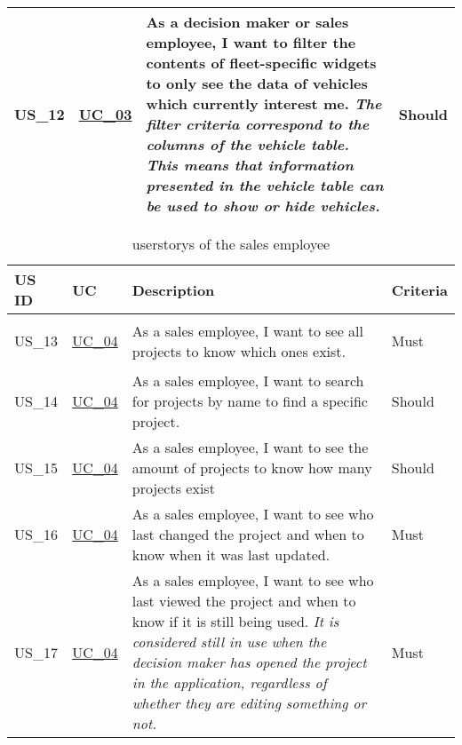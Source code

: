 \begin{footnotesize}
\begin{longtable}[L L L L]{ p{} p{} p{} p{}}
      \rowcolor{Gray}
      \hypertarget{Ref:US12}{US\_12} & \hyperlink{Ref:UC3}{UC\_03} & As a decision maker or sales employee, I want to filter the contents of fleet-specific \glspl{widget} to only see the data of vehicles which currently interest me.
      \newline
      \emph{The filter criteria correspond to the columns of the vehicle table. This means that information presented in the vehicle table can be used to show or hide vehicles.}
      & Should \\

      \bottomrule
    \end{longtable}
  \end{footnotesize}
  \rmfamily

  \sffamily
  \begin{footnotesize}
    \begin{longtable}[L L L L]{ p{} p{} p{} p{} }
      \caption                       %
          {\Glspl{userstory} of the sales employee} %
          \\
      \toprule
      \textbf{US ID} & \textbf{UC} & \textbf{Description} & \textbf{Criteria} \\
      \midrule
      
      \hypertarget{Ref:US13}{US\_13} & \hyperlink{Ref:UC4}{UC\_04} & As a sales employee, I want to see all projects to know which ones exist. & Must \\
      
      \rowcolor{Gray}
      \hypertarget{Ref:US14}{US\_14} & \hyperlink{Ref:UC4}{UC\_04} & As a sales employee, I want to search for projects by name to find a specific project. & Should \\
      
      \hypertarget{Ref:US15}{US\_15} & \hyperlink{Ref:UC4}{UC\_04} & As a sales employee, I want to see the amount of projects to know how many projects exist & Should \\
      
      \rowcolor{Gray}
      \hypertarget{Ref:US16}{US\_16} & \hyperlink{Ref:UC4}{UC\_04} & As a sales employee, I want to see who last changed the project and when to know when it was last updated. & Must \\
      \hypertarget{Ref:US17}{US\_17} & \hyperlink{Ref:UC4}{UC\_04} & As a sales employee, I want to see who last viewed the project and when to know if it is still being used.
      \newline
      \emph{It is considered still in use when the decision maker has opened the project in the application, regardless of whether they are editing something or not.} & Must \\
      

\end{longtable}
\end{footnotesize}
